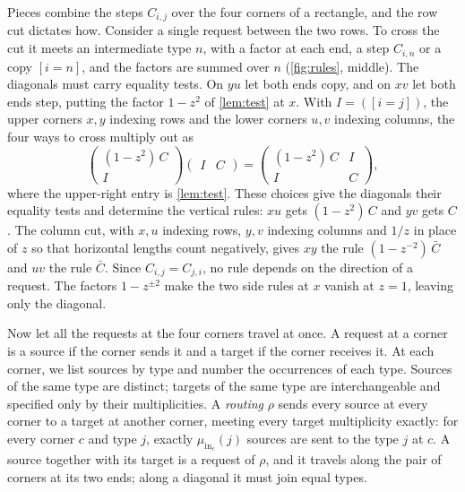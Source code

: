 \documentclass[11pt]{article}
\theoremstyle{definition}
\theoremstyle{definition}
\theoremstyle{remark}
\newcommand{\inn}{\mathrm{in}}
\begin{document}
Pieces combine the steps $C_{i,j}$ over the four corners of a rectangle, and the row cut dictates how. Consider a single request between the two rows. To cross the cut it meets an intermediate type $n$, with a factor at each end, a step $C_{i,n}$ or a copy $[i=n]$, and the factors are summed over $n$ (\cref{fig:rules}, middle). The diagonals must carry equality tests. On $yu$ let both ends copy, and on $xv$ let both ends step, putting the factor $1-z^2$ of \cref{lem:test} at $x$. With $I=([i=j])$, the upper corners $x,y$ indexing rows and the lower corners $u,v$ indexing columns, the four ways to cross multiply out as
\begin{equation}\label{eq:rules}
\begin{pmatrix}(1-z^2)\,C\\ I\end{pmatrix}\begin{pmatrix}I&C\end{pmatrix}=\begin{pmatrix}(1-z^2)\,C&I\\ I&C\end{pmatrix},
\end{equation}
where the upper-right entry is \cref{lem:test}. These choices give the diagonals their equality tests and determine the vertical rules: $xu$ gets $(1-z^2)\,C$ and $yv$ gets $C$. The column cut, with $x,u$ indexing rows, $y,v$ indexing columns and $1/z$ in place of $z$ so that horizontal lengths count negatively, gives $xy$ the rule $(1-z^{-2})\,\bar C$ and $uv$ the rule $\bar C$. Since $C_{i,j}=C_{j,i}$, no rule depends on the direction of a request. The factors $1-z^{\pm2}$ make the two side rules at $x$ vanish at $z=1$, leaving only the diagonal.

Now let all the requests at the four corners travel at once. A request at a corner is a source if the corner sends it and a target if the corner receives it. At each corner, we list sources by type and number the occurrences of each type. Sources of the same type are distinct; targets of the same type are interchangeable and specified only by their multiplicities. A \emph{routing} $\rho$ sends every source at every corner to a target at another corner, meeting every target multiplicity exactly: for every corner $c$ and type $j$, exactly $\mu_{\inn_c}(j)$ sources are sent to the type $j$ at $c$. A source together with its target is a request of $\rho$, and it travels along the pair of corners at its two ends; along a diagonal it must join equal types.
\end{document}
